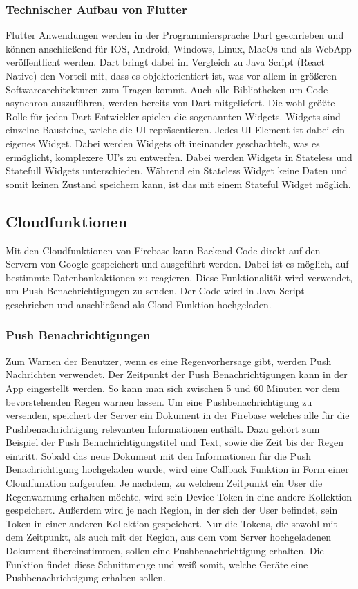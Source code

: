 \subsubsection{Technischer Aufbau von Flutter}
Flutter Anwendungen werden in der Programmiersprache Dart geschrieben und können anschließend für IOS, Android, Windows, Linux, MacOs und als WebApp 
veröffentlicht werden. Dart bringt dabei im Vergleich zu Java Script (React Native) den Vorteil mit, dass es objektorientiert ist, was vor allem in größeren 
Softwarearchitekturen zum Tragen kommt. Auch alle Bibliotheken um Code asynchron auszuführen, werden bereits von Dart mitgeliefert. 
Die wohl größte Rolle für jeden Dart Entwickler spielen die sogenannten Widgets. Widgets sind einzelne Bausteine, welche die UI repräsentieren. 
Jedes UI Element ist dabei ein eigenes Widget. Dabei werden Widgets oft ineinander geschachtelt, was es ermöglicht, komplexere UI’s zu entwerfen. 
Dabei werden Widgets in Stateless und Statefull Widgets unterschieden. Während ein Stateless Widget keine Daten und somit keinen Zustand speichern kann, 
ist das mit einem Stateful Widget möglich.

\subsection{Cloudfunktionen}
Mit den Cloudfunktionen von Firebase kann Backend-Code direkt auf den Servern von Google gespeichert und ausgeführt werden. 
Dabei ist es möglich, auf bestimmte Datenbankaktionen zu reagieren. 
Diese Funktionalität wird verwendet, um Push Benachrichtigungen zu senden. 
Der Code wird in Java Script geschrieben und anschließend als Cloud Funktion hochgeladen.

\subsubsection{Push Benachrichtigungen}\label{sec:Pushbenachrichtigungen}
Zum Warnen der Benutzer, wenn es eine Regenvorhersage gibt, werden Push Nachrichten verwendet. 
Der Zeitpunkt der Push Benachrichtigungen kann in der App eingestellt werden. 
So kann man sich zwischen 5 und 60 Minuten vor dem bevorstehenden Regen warnen lassen.  
Um eine Pushbenachrichtigung zu versenden, speichert der Server ein Dokument in der Firebase welches alle für die 
Pushbenachrichtigung relevanten Informationen enthält. 
Dazu gehört zum Beispiel der Push Benachrichtigungstitel und Text, sowie die Zeit bis der Regen eintritt.
Sobald das neue Dokument mit den Informationen für die Push Benachrichtigung hochgeladen wurde, wird eine Callback 
Funktion in Form einer Cloudfunktion aufgerufen.
Je nachdem, zu welchem Zeitpunkt ein User die Regenwarnung erhalten möchte, wird sein Device Token in eine andere 
Kollektion gespeichert.   
Außerdem wird je nach Region, in der sich der User befindet, sein Token in einer anderen Kollektion gespeichert. 
Nur die Tokens, die sowohl mit dem Zeitpunkt, als auch mit der Region, aus dem vom Server hochgeladenen Dokument übereinstimmen, 
sollen eine Pushbenachrichtigung erhalten. 
Die Funktion findet diese Schnittmenge und weiß somit, welche Geräte eine Pushbenachrichtigung erhalten sollen.

